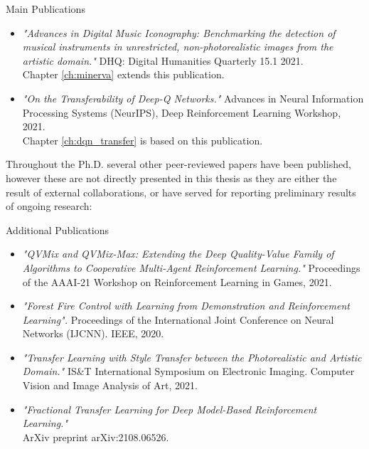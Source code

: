 \begin{remark}{Main Publications}
\begin{itemize}
	\item \citet{sabatelli2021advances} \textit{"Advances in Digital Music Iconography: Benchmarking the detection of musical instruments in unrestricted, non-photorealistic images from the artistic domain."} DHQ: Digital Humanities Quarterly 15.1 2021.
	\\ Chapter \ref{ch:minerva} extends this publication.

	\item \citet{sabatelli2021transferability} \textit{"On the Transferability of Deep-Q Networks."} Advances in Neural Information Processing Systems (NeurIPS), Deep Reinforcement Learning Workshop, 2021. \\
	Chapter \ref{ch:dqn_transfer} is based on this publication.
 
\end{itemize}
\end{remark}

Throughout the Ph.D. several other peer-reviewed papers have been published, however these are not directly presented in this thesis as they are either the result of external collaborations, or have served for reporting preliminary results of ongoing research:

\begin{takeaway}{Additional Publications}
\begin{itemize}
	\item \citet{leroy21qvmix} \textit{"QVMix and QVMix-Max: Extending the Deep Quality-Value Family of Algorithms to Cooperative Multi-Agent Reinforcement Learning."} Proceedings of the AAAI-21 Workshop on Reinforcement Learning in Games, 2021. 
	\item \citet{hammond2020forest} \textit{"Forest Fire Control with Learning from Demonstration and Reinforcement Learning".} Proceedings of the International Joint Conference on Neural Networks (IJCNN). IEEE, 2020.
	\item \citet{banartransfer} \textit{"Transfer Learning with Style Transfer between the Photorealistic and Artistic Domain."} IS\&T International Symposium on Electronic Imaging. Computer Vision and Image Analysis of Art, 2021.
	\item \citet{sasso2021fractional} \textit{"Fractional Transfer Learning for Deep Model-Based Reinforcement Learning."} \\ ArXiv preprint arXiv:2108.06526. 

\end{itemize}
\end{takeaway}

